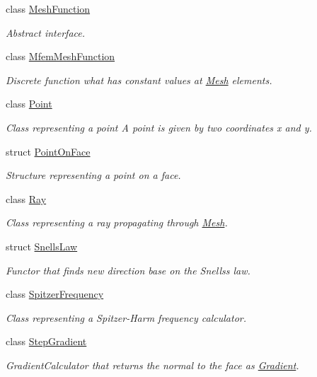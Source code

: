 \begin{DoxyCompactItemize}
class \hyperlink{classraytracer_1_1MeshFunction}{Mesh\+Function}
\begin{DoxyCompactList}\small\item\em Abstract interface. \end{DoxyCompactList}\item 
class \hyperlink{classraytracer_1_1MfemMeshFunction}{Mfem\+Mesh\+Function}
\begin{DoxyCompactList}\small\item\em Discrete function what has constant values at \hyperlink{classraytracer_1_1Mesh}{Mesh} elements. \end{DoxyCompactList}\item 
class \hyperlink{classraytracer_1_1Point}{Point}
\begin{DoxyCompactList}\small\item\em Class representing a point A point is given by two coordinates x and y. \end{DoxyCompactList}\item 
struct \hyperlink{structraytracer_1_1PointOnFace}{Point\+On\+Face}
\begin{DoxyCompactList}\small\item\em Structure representing a point on a face. \end{DoxyCompactList}\item 
class \hyperlink{classraytracer_1_1Ray}{Ray}
\begin{DoxyCompactList}\small\item\em Class representing a ray propagating through \hyperlink{classraytracer_1_1Mesh}{Mesh}. \end{DoxyCompactList}\item 
struct \hyperlink{structraytracer_1_1SnellsLaw}{Snells\+Law}
\begin{DoxyCompactList}\small\item\em Functor that finds new direction base on the Snells\textquotesingle{}s law. \end{DoxyCompactList}\item 
class \hyperlink{classraytracer_1_1SpitzerFrequency}{Spitzer\+Frequency}
\begin{DoxyCompactList}\small\item\em Class representing a Spitzer-\/\+Harm frequency calculator. \end{DoxyCompactList}\item 
class \hyperlink{classraytracer_1_1StepGradient}{Step\+Gradient}
\begin{DoxyCompactList}\small\item\em Gradient\+Calculator that returns the normal to the face as \hyperlink{classraytracer_1_1Gradient}{Gradient}. \end{DoxyCompactList}\item 

\end{DoxyCompactItemize}
